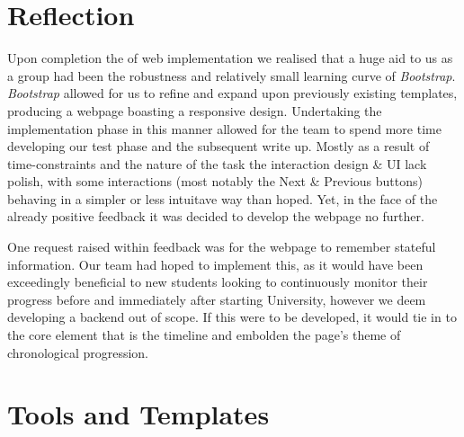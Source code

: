 \documentclass[a4paper, notoc]{tufte-handout}
\begin{document}
\section{Reflection}


Upon completion the of web implementation we realised that a huge aid to us as a group had been the robustness and relatively small learning curve of \textit{Bootstrap}. \textit{Bootstrap} allowed for us to refine and expand upon previously existing templates, producing a webpage boasting a responsive design. Undertaking the implementation phase in this manner allowed for the team to spend more time developing our test phase and the subsequent write up. Mostly as a result of time-constraints and the nature of the task the interaction design \& UI lack polish, with some interactions (most notably the Next \& Previous buttons) behaving in a simpler or less intuitave way than hoped. Yet, in the face of the already positive feedback it was decided to develop the webpage no further.

One request raised within feedback was for the webpage to remember stateful information. Our team had hoped to implement this, as it would have been exceedingly beneficial to new students looking to continuously monitor their progress before and immediately after starting University, however we deem developing a backend out of scope. If this were to be developed, it would tie in to the core element that is the timeline and embolden the page's theme of chronological progression.


\section{Tools and Templates}

\end{document}
